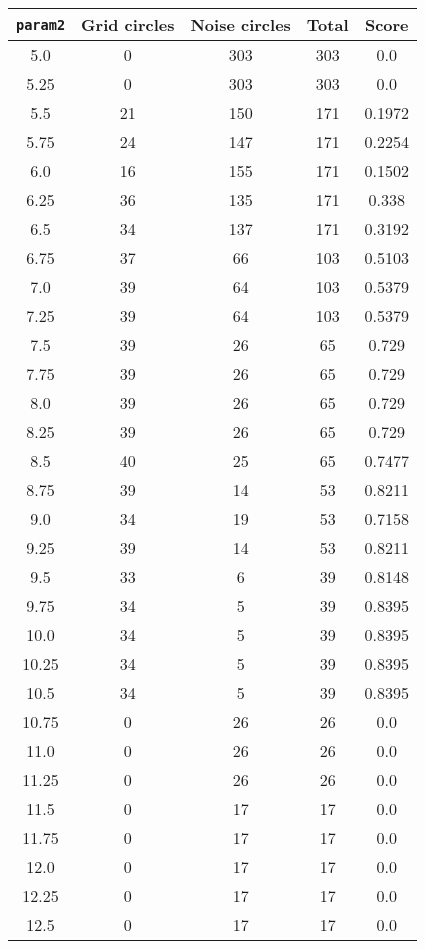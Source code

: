 \documentclass[letterpaper, 12pt]{article}
\begin{document}
\begin{longtable}{|c|c|c|c|c|}
\hline
\textbf{\texttt{param2}} & \textbf{Grid circles} & \textbf{Noise circles} & \textbf{Total} & \textbf{Score} \\
\hline
5.0 & 0 & 303 & 303 & 0.0 \\
\hline
5.25 & 0 & 303 & 303 & 0.0 \\
\hline
5.5 & 21 & 150 & 171 & 0.1972 \\
\hline
5.75 & 24 & 147 & 171 & 0.2254 \\
\hline
6.0 & 16 & 155 & 171 & 0.1502 \\
\hline
6.25 & 36 & 135 & 171 & 0.338 \\
\hline
6.5 & 34 & 137 & 171 & 0.3192 \\
\hline
6.75 & 37 & 66 & 103 & 0.5103 \\
\hline
7.0 & 39 & 64 & 103 & 0.5379 \\
\hline
7.25 & 39 & 64 & 103 & 0.5379 \\
\hline
7.5 & 39 & 26 & 65 & 0.729 \\
\hline
7.75 & 39 & 26 & 65 & 0.729 \\
\hline
8.0 & 39 & 26 & 65 & 0.729 \\
\hline
8.25 & 39 & 26 & 65 & 0.729 \\
\hline
8.5 & 40 & 25 & 65 & 0.7477 \\
\hline
8.75 & 39 & 14 & 53 & 0.8211 \\
\hline
9.0 & 34 & 19 & 53 & 0.7158 \\
\hline
9.25 & 39 & 14 & 53 & 0.8211 \\
\hline
9.5 & 33 & 6 & 39 & 0.8148 \\
\hline
9.75 & 34 & 5 & 39 & 0.8395 \\
\hline
10.0 & 34 & 5 & 39 & 0.8395 \\
\hline
10.25 & 34 & 5 & 39 & 0.8395 \\
\hline
10.5 & 34 & 5 & 39 & 0.8395 \\
\hline
10.75 & 0 & 26 & 26 & 0.0 \\
\hline
11.0 & 0 & 26 & 26 & 0.0 \\
\hline
11.25 & 0 & 26 & 26 & 0.0 \\
\hline
11.5 & 0 & 17 & 17 & 0.0 \\
\hline
11.75 & 0 & 17 & 17 & 0.0 \\
\hline
12.0 & 0 & 17 & 17 & 0.0 \\
\hline
12.25 & 0 & 17 & 17 & 0.0 \\
\hline
12.5 & 0 & 17 & 17 & 0.0 \\

\end{longtable}
\end{document}
